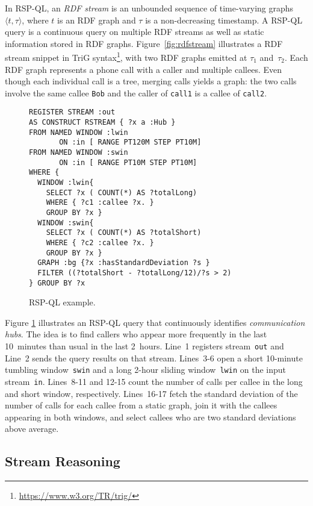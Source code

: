 In RSP-QL, an \textit{RDF stream} is an unbounded sequence of
time-varying graphs $\langle t,\tau\rangle$, where $t$ is an RDF graph
and $\tau$ is a non-decreasing timestamp.  A RSP-QL query is a
continuous query on multiple RDF streams as well as static information
stored in RDF graphs.  Figure~\ref{fig:rdfstream} illustrates a RDF
stream snippet in TriG
syntax\footnote{\url{https://www.w3.org/TR/trig/}}, with two RDF
graphs emitted at $\tau_1$ and~$\tau_2$. Each RDF graph represents a
phone call with a caller and multiple callees. Even though each
individual call is a tree, merging calls yields a graph: the two calls
involve the same callee \lstinline{Bob} and the caller of
\lstinline{call1} is a callee of \lstinline{call2}.

\begin{figure}[!h]
\begin{lstlisting}[language=rsp-ql]
REGISTER STREAM :out
AS CONSTRUCT RSTREAM { ?x a :Hub }
FROM NAMED WINDOW :lwin 
       ON :in [ RANGE PT120M STEP PT10M]
FROM NAMED WINDOW :swin 
       ON :in [ RANGE PT10M STEP PT10M]
WHERE { 
  WINDOW :lwin{
    SELECT ?x ( COUNT(*) AS ?totalLong)
    WHERE { ?c1 :callee ?x. }
    GROUP BY ?x }
  WINDOW :swin{
    SELECT ?x ( COUNT(*) AS ?totalShort)
    WHERE { ?c2 :callee ?x. }
    GROUP BY ?x }
  GRAPH :bg {?x :hasStandardDeviation ?s }
  FILTER ((?totalShort - ?totalLong/12)/?s > 2)
} GROUP BY ?x
\end{lstlisting}
\vspace*{-4mm}
\caption{\label{fig:rspql}RSP-QL example.}
\end{figure}

Figure \ref{fig:rspql} illustrates an RSP-QL query that continuously
identifies \textit{communication hubs}. The idea is to find callers
who appear more frequently in the last 10~minutes than usual in the
last 2~hours. Line~1 registers stream~\lstinline{out} and Line~2 sends
the query results on that stream. \mbox{Lines 3-6} open a short
10-minute tumbling window~\lstinline{swin} and a long \mbox{2-hour}
sliding window~\lstinline{lwin} on the input
stream~\lstinline{in}. \mbox{Lines 8-11} and \mbox{12-15} count the
number of calls per callee in the long and short window,
respectively. \mbox{Lines 16-17} fetch the standard deviation of the
number of calls for each callee from a static graph, join it with the
callees appearing in both windows, and select callees who are two
standard deviations above average.

\subsection{Stream Reasoning}\label{sec:sr} %

